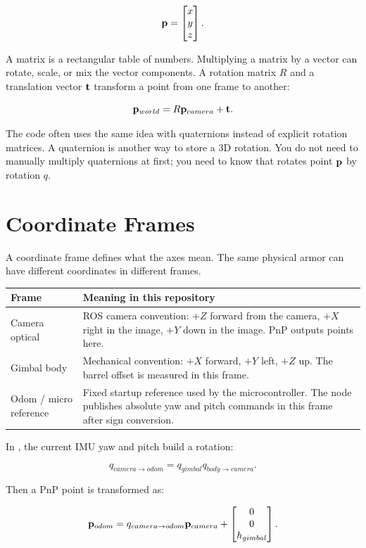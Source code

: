 \[
\mathbf{p} =
\begin{bmatrix}
x \\ y \\ z
\end{bmatrix}.
\]

A matrix is a rectangular table of numbers. Multiplying a matrix by a vector
can rotate, scale, or mix the vector components. A rotation matrix $R$ and a
translation vector $\mathbf{t}$ transform a point from one frame to another:

\[
\mathbf{p}_{world} = R \mathbf{p}_{camera} + \mathbf{t}.
\]

The code often uses the same idea with quaternions instead of explicit
rotation matrices. A quaternion is another way to store a 3D rotation. You do
not need to manually multiply quaternions at first; you need to know that
 rotates point $\mathbf{p}$ by rotation $q$.

\section{Coordinate Frames}

A coordinate frame defines what the axes mean. The same physical armor can
have different coordinates in different frames.

\begin{longtable}{p{}p{}}
\toprule
Frame & Meaning in this repository \\
\midrule
Camera optical & ROS camera convention: $+Z$ forward from the camera,
$+X$ right in the image, $+Y$ down in the image. PnP outputs points here. \\
Gimbal body & Mechanical convention: $+X$ forward, $+Y$ left, $+Z$ up. The
barrel offset is measured in this frame. \\
Odom / micro reference & Fixed startup reference used by the microcontroller.
The node publishes absolute yaw and pitch commands in this frame after sign
conversion. \\
\bottomrule
\end{longtable}

In , the current IMU yaw and pitch build a
rotation:

\[
q_{camera\rightarrow odom} = q_{gimbal} q_{body\rightarrow camera}.
\]

Then a PnP point is transformed as:

\[
\mathbf{p}_{odom} =
q_{camera\rightarrow odom} \mathbf{p}_{camera} +
\begin{bmatrix}0\\0\\h_{gimbal}\end{bmatrix}.
\]

